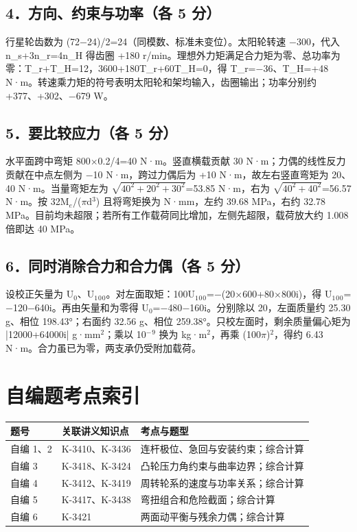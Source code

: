 \documentclass[zihao=5,a4paper,UTF8,fontset=fandol]{ctexart}
\begin{document}
\subsection{4．方向、约束与功率（各 5 分）}

行星轮齿数为 (72$-$24)/2=24（同模数、标准未变位）。太阳轮转速 $-$300，代入 n\_s+3n\_r=4n\_H 得齿圈 +180 r/min。理想外力矩满足合力矩为零、总功率为零：T\_r+T\_H=12，3600+180T\_r+60T\_H=0，得 T\_r=$-$36、T\_H=+48 N·m。转速乘力矩的符号表明太阳轮和架均输入，齿圈输出；功率分别约 +377、+302、$-$679 W。


\subsection{5．要比较应力（各 5 分）}

水平面跨中弯矩 800$\times$0.2/4=40 N·m。竖直横载贡献 30 N·m；力偶的线性反力贡献在中点左侧为 $-$10 N·m，跨过力偶后为 +10 N·m，故左右竖直弯矩为 20、40 N·m。当量弯矩左为 $\sqrt{40^{2}+20^{2}+30^{2}}$=53.85 N·m，右为 $\sqrt{40^{2}+40^{2}}$=56.57 N·m。按 32M$_{e}$/($\pi$d$^{3}$) 且将弯矩换为 N·mm，左约 39.68 MPa，右约 32.78 MPa。目前均未超限；若所有工作载荷同比增加，左侧先超限，载荷放大约 1.008 倍即达 40 MPa。


\subsection{6．同时消除合力和合力偶（各 5 分）}

设校正矢量为 U$_{0}$、U$_{1}$$_{0}$$_{0}$。对左面取矩：100U$_{1}$$_{0}$$_{0}$=$-$(20$\times$600+80$\times$800i)，得 U$_{1}$$_{0}$$_{0}$=$-$120$-$640i。再由矢量和为零得 U$_{0}$=$-$480$-$160i。分别除以 20，左面质量约 25.30 g、相位 198.43°；右面约 32.56 g、相位 259.38°。只校左面时，剩余质量偏心矩为 |12000+64000i| g·mm$^{2}$；乘以 10$^{-}$$^{9}$ 换为 kg·m$^{2}$，再乘 (100$\pi$)$^{2}$，得约 6.43 N·m。合力虽已为零，两支承仍受附加载荷。




\section{自编题考点索引}

\begin{longtable}{p{4.86cm}p{4.86cm}p{4.86cm}}
\toprule
题号 & 关联讲义知识点 & 考点与题型 \\

\midrule
\endhead
自编 1、2 & K-3410、K-3436 & 连杆极位、急回与安装约束；综合计算 \\
自编 3 & K-3418、K-3424 & 凸轮压力角约束与曲率边界；综合计算 \\
自编 4 & K-3412、K-3419 & 周转轮系的速度与功率关系；综合计算 \\
自编 5 & K-3417、K-3438 & 弯扭组合和危险截面；综合计算 \\
自编 6 & K-3421 & 两面动平衡与残余力偶；综合计算 \\
\bottomrule
\end{longtable}
\end{document}

